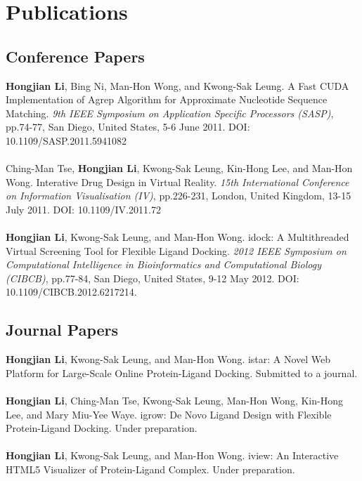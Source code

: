 \chapter{Publications}

\section{Conference Papers}

\textbf{Hongjian Li}, Bing Ni, Man-Hon Wong, and Kwong-Sak Leung. A Fast CUDA Implementation of Agrep Algorithm for Approximate Nucleotide Sequence Matching. \textit{9th IEEE Symposium on Application Specific Processors (SASP)}, pp.74-77, San Diego, United States, 5-6 June 2011. DOI: 10.1109/SASP.2011.5941082
\\\\
Ching-Man Tse, \textbf{Hongjian Li}, Kwong-Sak Leung, Kin-Hong Lee, and Man-Hon Wong. Interative Drug Design in Virtual Reality. \textit{15th International Conference on Information Visualisation (IV)}, pp.226-231, London, United Kingdom, 13-15 July 2011. DOI: 10.1109/IV.2011.72
\\\\
\textbf{Hongjian Li}, Kwong-Sak Leung, and Man-Hon Wong. idock: A Multithreaded Virtual Screening Tool for Flexible Ligand Docking. \textit{2012 IEEE Symposium on Computational Intelligence in Bioinformatics and Computational Biology (CIBCB)}, pp.77-84, San Diego, United States, 9-12 May 2012. DOI: 10.1109/CIBCB.2012.6217214.

\section{Journal Papers}

\textbf{Hongjian Li}, Kwong-Sak Leung, and Man-Hon Wong. istar: A Novel Web Platform for Large-Scale Online Protein-Ligand Docking. Submitted to a journal.
\\\\
\textbf{Hongjian Li}, Ching-Man Tse, Kwong-Sak Leung, Man-Hon Wong, Kin-Hong Lee, and Mary Miu-Yee Waye. igrow: De Novo Ligand Design with Flexible Protein-Ligand Docking. Under preparation.
\\\\
\textbf{Hongjian Li}, Kwong-Sak Leung, and Man-Hon Wong. iview: An Interactive HTML5 Visualizer of Protein-Ligand Complex. Under preparation.

\chapterend
